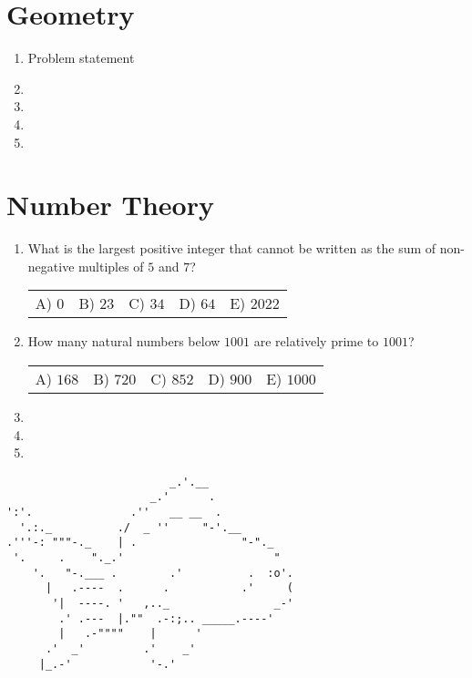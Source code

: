 \documentclass{article}
\newcommand{\answers}[5]{
    \newline
    {
        \centering
        \begin{tabular}{p{0.15\textwidth} p{0.15\textwidth} p{0.15\textwidth} p{0.15\textwidth} p{0.15\textwidth}}
            A) #1 & B) #2 & C) #3 & D) #4 & E) #5
        \end{tabular}
    }
}
\begin{document}
\section{Geometry}
\begin{enumerate}[1.]

\item %
Problem statement


\item %


\item %


\item %


\item %

\end{enumerate}



















\section{Number Theory}
\begin{enumerate}[1.]

\item %
What is the largest positive integer that cannot be written as the sum of non-negative multiples of $5$ and $7$?
\answers{$0$}{$23$}{$34$}{$64$}{$2022$}


\item %
How many natural numbers below $1001$ are relatively prime to $1001$?
\answers{$168$}{$720$}{$852$}{$900$}{$1000$}

\item %


\item %


\item %

\end{enumerate}

\vfill


\vfill
\centering
\begin{BVerbatim}
                         _.'.__
                      _.'      .
':'.               .''   __ __  .
  '.:._          ./  _ ''     "-'.__
.'''-: """-._    | .                "-"._
 '.     .    "._.'                       "
    '.   "-.___ .        .'          .  :o'.
      |   .----  .      .           .'     (
       '|  ----. '   ,.._                _-'
        .' .---  |.""  .-:;.. _____.----'
        |   .-""""    |      '
      .'  _'         .'    _'
     |_.-'            '-.'
\end{BVerbatim}
\end{document}
